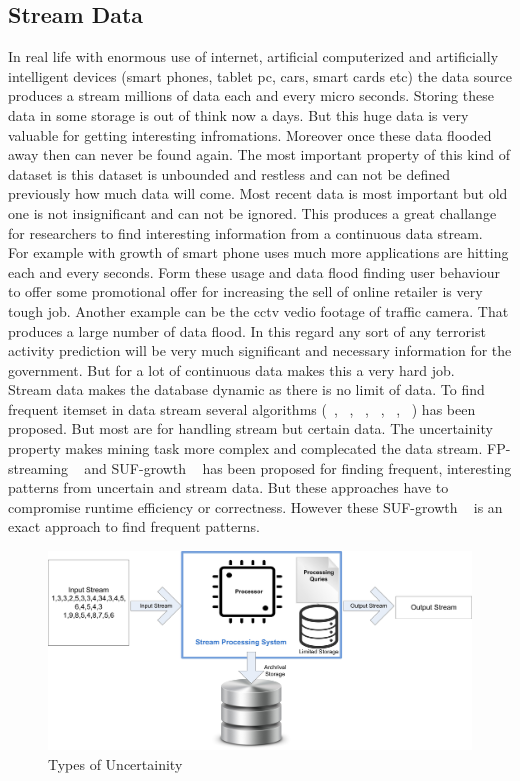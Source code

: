 \subsection{Stream Data}
In real life with enormous use of internet, artificial computerized and artificially intelligent devices (smart phones, tablet pc, cars, smart cards etc) the data source produces a stream millions of data each and every micro seconds. Storing these data in some storage is out of think now a days. But this huge data is very valuable for getting interesting infromations. Moreover once these data flooded away then can never be found again. The most important property of this kind of dataset is this dataset is unbounded and restless and can not be defined previously how much data will come. Most recent data is most important but old one is not insignificant and can not be ignored. This produces a great challange for researchers to find interesting information from a continuous data stream.\\
For example with growth of smart phone uses much more applications are hitting each and every seconds. Form these usage and data flood finding user behaviour to offer some promotional offer for increasing the sell of online retailer is very tough job. Another example can be the cctv vedio footage of traffic camera. That produces a large number of data flood. In this regard any sort of any terrorist activity prediction will be very much significant and necessary information for the government. But for a lot of continuous data makes this a very hard job.\\
Stream data makes the database dynamic as there is no limit of data. To find frequent itemset in data stream several algorithms (~\cite{uncertain_01}, ~\cite{uncertain_02}, ~\cite{uncertain_03}, ~\cite{uncertain_04}, ~\cite{uncertain_05}, ~\cite{uncertain_06}) has been proposed. But most are for handling stream but certain data. The uncertainity property makes mining task more complex and complecated the data stream. FP-streaming ~\cite{suf_growth} and  SUF-growth ~\cite{suf_growth} has been proposed for finding frequent, interesting patterns from uncertain and stream data. But these approaches have to compromise runtime efficiency or correctness. However these SUF-growth ~\cite{suf_growth} is an exact approach to find frequent patterns.
\begin{figure}
\centering
  \includegraphics[width=.9\textwidth]{images/stream_data.jpg}
\caption{Types of Uncertainity}
\label{figure:stream_data}
\end{figure}


